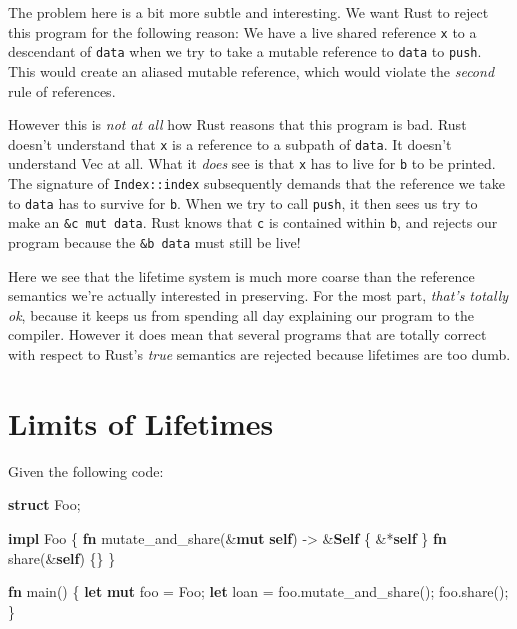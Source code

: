 \documentclass[a4paper,]{book}
\newenvironment{Shaded}{\begin{snugshade}}{\end{snugshade}}
\newcommand{\KeywordTok}[1]{\textcolor[rgb]{0.13,0.29,0.53}{\textbf{{#1}}}}
\newcommand{\NormalTok}[1]{{#1}}
\begin{document}
The problem here is a bit more subtle and interesting. We want Rust to
reject this program for the following reason: We have a live shared
reference \texttt{x} to a descendant of \texttt{data} when we try to
take a mutable reference to \texttt{data} to \texttt{push}. This would
create an aliased mutable reference, which would violate the
\emph{second} rule of references.

However this is \emph{not at all} how Rust reasons that this program is
bad. Rust doesn't understand that \texttt{x} is a reference to a subpath
of \texttt{data}. It doesn't understand Vec at all. What it \emph{does}
see is that \texttt{x} has to live for \texttt{\textquotesingle{}b} to
be printed. The signature of \texttt{Index::index} subsequently demands
that the reference we take to \texttt{data} has to survive for
\texttt{\textquotesingle{}b}. When we try to call \texttt{push}, it then
sees us try to make an \texttt{\&\textquotesingle{}c\ mut\ data}. Rust
knows that \texttt{\textquotesingle{}c} is contained within
\texttt{\textquotesingle{}b}, and rejects our program because the
\texttt{\&\textquotesingle{}b\ data} must still be live!

Here we see that the lifetime system is much more coarse than the
reference semantics we're actually interested in preserving. For the
most part, \emph{that's totally ok}, because it keeps us from spending
all day explaining our program to the compiler. However it does mean
that several programs that are totally correct with respect to Rust's
\emph{true} semantics are rejected because lifetimes are too dumb.

\section{Limits of Lifetimes}\label{sec--lifetime-mismatch}

Given the following code:

\begin{Shaded}
\begin{Highlighting}[]
\KeywordTok{struct} \NormalTok{Foo;}

\KeywordTok{impl} \NormalTok{Foo \{}
    \KeywordTok{fn} \NormalTok{mutate_and_share(&}\KeywordTok{mut} \KeywordTok{self}\NormalTok{) -> &}\KeywordTok{Self} \NormalTok{\{ &*}\KeywordTok{self} \NormalTok{\}}
    \KeywordTok{fn} \NormalTok{share(&}\KeywordTok{self}\NormalTok{) \{\}}
\NormalTok{\}}

\KeywordTok{fn} \NormalTok{main() \{}
    \KeywordTok{let} \KeywordTok{mut} \NormalTok{foo = Foo;}
    \KeywordTok{let} \NormalTok{loan = foo.mutate_and_share();}
    \NormalTok{foo.share();}
\NormalTok{\}}
\end{Highlighting}
\end{Shaded}
\end{document}
